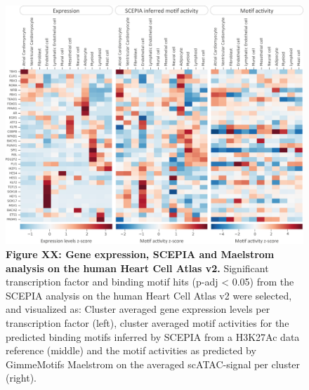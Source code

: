 
\begin{figure}
    \centering
    \includegraphics[width=0.75\linewidth]{SCEPIAhitsHHCA_HeatmapExprSCEPIAMaelstrom_v2.png}
    \caption{\textbf{Figure XX: Gene expression, SCEPIA and Maelstrom analysis on the human Heart Cell Atlas v2.} Significant transcription factor and binding motif hits (p-adj < 0.05) from the SCEPIA analysis on the human Heart Cell Atlas v2 were selected, and visualized as: Cluster averaged gene expression levels per transcription factor (left), cluster averaged motif activities for the predicted binding motifs inferred by SCEPIA from a H3K27Ac data reference (middle) and the motif activities as predicted by GimmeMotifs Maelstrom on the averaged scATAC-signal per cluster (right).}
    \label{fig:scepia_hhca2}
\end{figure}

